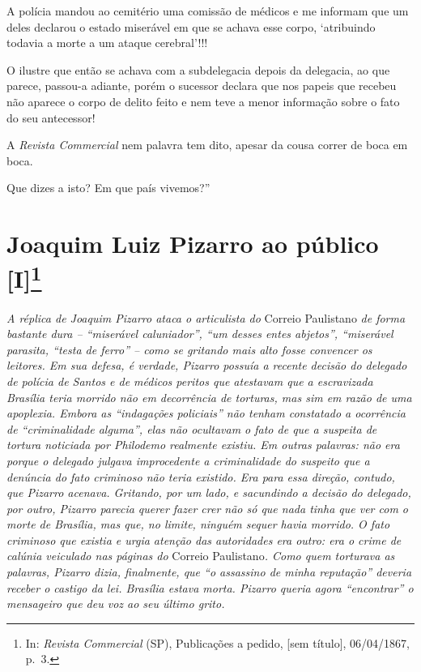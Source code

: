 A polícia mandou ao cemitério uma comissão de médicos e me informam que
um deles declarou o estado miserável em que se achava esse corpo,
`atribuindo todavia a morte a um ataque cerebral'!!!

O ilustre que então se achava com a subdelegacia depois da delegacia, ao
que parece, passou-a adiante, porém o sucessor declara que nos papeis
que recebeu não aparece o corpo de delito feito e nem teve a menor
informação sobre o fato do seu antecessor!

A \emph{Revista Commercial} nem palavra tem dito, apesar da cousa correr
de boca em boca.

Que dizes a isto? Em que país vivemos?''

\chapter{Joaquim Luiz Pizarro ao público
{[}I{]}\footnote{ In: \emph{Revista Commercial} (SP), Publicações a
  pedido, {[}sem título{]}, 06/04/1867, p.~3.}}

\begin{didascalia}
\emph{A réplica de Joaquim Pizarro ataca o articulista do} Correio
Paulistano \emph{de forma bastante dura -- ``miserável caluniador'', ``um
desses entes abjetos'', ``miserável parasita, ``testa de ferro'' -- como se
gritando mais alto fosse convencer os leitores. Em sua defesa, é
verdade, Pizarro possuía a recente decisão do delegado de polícia de
Santos e de médicos peritos que atestavam que a escravizada Brasília
teria morrido não em decorrência de torturas, mas sim em razão de uma
apoplexia. Embora as ``indagações policiais'' não tenham constatado a
ocorrência de ``criminalidade alguma'', elas não ocultavam o fato de que a
suspeita de tortura noticiada por Philodemo realmente existiu. Em outras
palavras: não era porque o delegado julgava improcedente a criminalidade
do suspeito que a denúncia do fato criminoso não teria existido. Era
para essa direção, contudo, que Pizarro acenava. Gritando, por um lado,
e sacundindo a decisão do delegado, por outro, Pizarro parecia querer
fazer crer não só que nada tinha que ver com o morte de Brasília, mas
que, no limite, ninguém sequer havia morrido. O fato criminoso que
existia e urgia atenção das autoridades era outro: era o crime de
calúnia veiculado nas páginas do} Correio Paulistano\emph{. Como quem
torturava as palavras, Pizarro dizia, finalmente, que ``o assassino de
minha reputação'' deveria receber o castigo da lei. Brasília estava
morta. Pizarro queria agora ``encontrar'' o mensageiro que deu voz ao seu
último grito.}
\end{didascalia}


